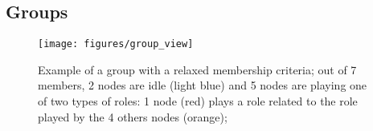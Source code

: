 



\subsection{Groups}

\begin{figure}[t!]
	\centering
	\texttt{[image: figures/group\_view]}
	\caption{Example of a group with a relaxed membership criteria; out of 7 members, 2 nodes are idle (light blue) and 5 nodes are playing one of two types of roles: 1 node (red) plays a role related to the role played by the 4 others nodes (orange);}
	\label{fig:group_view}
\end{figure}




